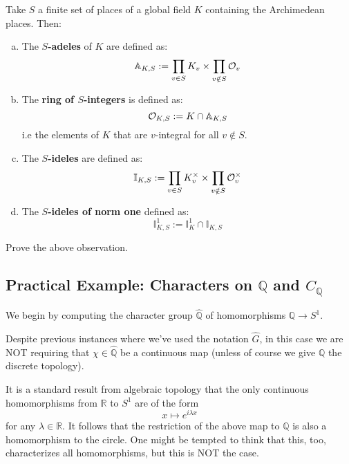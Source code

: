 \documentclass[11pt, x11names]{article}
\newcommand{\qq}{\mathbb{Q}}
\newcommand{\rr}{\mathbb{R}}
\renewcommand{\aa}{\mathbb{A}}
\newcommand{\ii}{\mathbb{I}}
\renewcommand{\hat}{\widehat}
\begin{document}
\begin{defn}
Take $S$ a finite set of places of a global field $K$ containing the Archimedean places. Then:
\begin{enumerate}[(a)]
    \item The \textbf{$S$-adeles} of $K$ are defined as:
    \begin{equation*}
        \aa_{K, S} := \prod_{v \in S} K_v \times \prod_{v \notin S} \calo_v
    \end{equation*}
    \item The \textbf{ring of $S$-integers} is defined as:
    \begin{equation*}
        \calo_{K, S} := K \cap \aa_{K, S}
    \end{equation*}
    i.e the elements of $K$ that are $v$-integral for all $v \notin S$.
    \item The \textbf{$S$-ideles} are defined as:
    \begin{equation*}
        \ii_{K, S} := \prod_{v \in S}K_v^\times \times \prod_{v \notin S}\calo_v^\times 
    \end{equation*}
    \item The \textbf{$S$-ideles of norm one} defined as:
    \begin{equation*}
        \ii_{K, S}^1 := \ii_K^1 \cap \ii_{K, S}
    \end{equation*}
\end{enumerate}
\end{defn}

\begin{observation}

\end{observation}

\begin{exercise}
    Prove the above observation.
\end{exercise}

\subsection{Practical Example: Characters on $\qq$ and $C_\qq$}
\label{subsection: character group of Q}
We begin by computing the character group $\hat{\qq}$ of homomorphisms $\qq \to S^1$.
\begin{warning}
    Despite previous instances where we've used the notation $\hat{G}$, in this case we are NOT requiring that $\chi \in \hat{\qq}$ be a continuous map (unless of course we give $\qq$ the discrete topology).
\end{warning}
It is a standard result from algebraic topology that the only continuous homomorphisms from $\rr$ to $S^1$ are of the form
\begin{equation*}
    x \mapsto e^{i \lambda x}
\end{equation*}
for any $\lambda \in \rr$. It follows that the restriction of the above map to $\qq$ is also a homomorphism to the circle. One might be tempted to think that this, too, characterizes all homomorphisms, but this is NOT the case.\\
\end{document}
